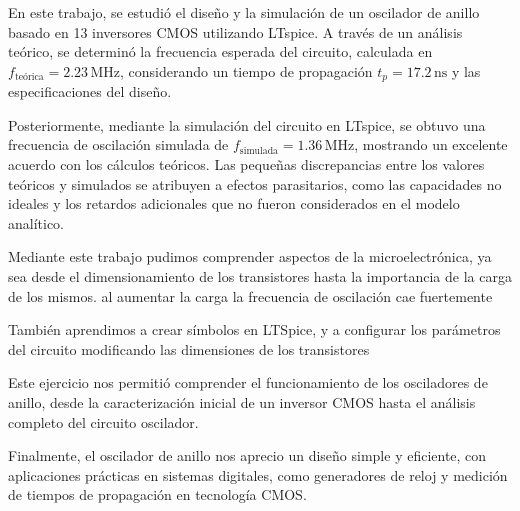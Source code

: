 \documentclass[11pt, a4paper]{article}
\begin{document}
En este trabajo, se estudió el diseño y la simulación de un oscilador de anillo basado en 13 inversores CMOS utilizando LTspice. A través de un análisis teórico, se determinó la frecuencia esperada del circuito, calculada en \( f_{\text{teórica}} = 2.23 \, \mathrm{MHz} \), considerando un tiempo de propagación \( t_p = 17.2 \, \mathrm{ns} \) y las especificaciones del diseño.

Posteriormente, mediante la simulación del circuito en LTspice, se obtuvo una frecuencia de oscilación simulada de \( f_{\text{simulada}} = 1.36 \, \mathrm{MHz} \), mostrando un excelente acuerdo con los cálculos teóricos. Las pequeñas discrepancias entre los valores teóricos y simulados se atribuyen a efectos parasitarios, como las capacidades no ideales y los retardos adicionales que no fueron considerados en el modelo analítico.

Mediante este trabajo pudimos comprender aspectos de la microelectrónica, ya sea desde el dimensionamiento de los transistores hasta la importancia de la carga de los mismos. al aumentar la carga la frecuencia de oscilación cae fuertemente

También aprendimos a crear símbolos en LTSpice, y a configurar los parámetros del circuito modificando las dimensiones de los transistores

Este ejercicio nos permitió comprender el funcionamiento de los osciladores de anillo, desde la caracterización inicial de un inversor CMOS hasta el análisis completo del circuito oscilador. 

Finalmente, el oscilador de anillo nos aprecio un diseño simple y eficiente, con aplicaciones prácticas en sistemas digitales, como generadores de reloj y medición de tiempos de propagación en tecnología CMOS. 
\end{document}
